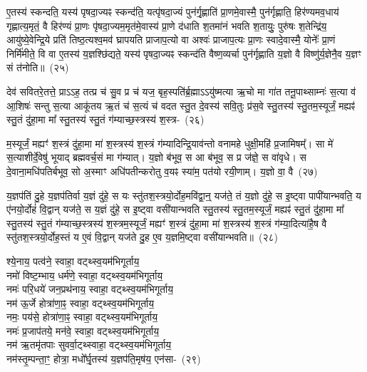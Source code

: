 ए॒तस्य॑ स्कन्दति॒ यस्य॑ पृषदा॒ज्यꣴ स्कन्द॑ति॒ यत्पृ॑षदा॒ज्यं पुन॑र्गृ॒ह्णाति॑ प्रा॒णमे॒वास्मै॒ पुन॑र्गृह्णाति॒ हिर॑ण्यमव॒धाय॑ गृह्णात्य॒मृतं॒ वै हिर॑ण्यं प्रा॒णः पृ॑षदा॒ज्यम॒मृत॑मे॒वास्य॑ प्रा॒णे द॑धाति श॒तमा॑नं भवति श॒तायुः॒ पुरु॑षः श॒तेन्द्रि॑य॒ आयु॑ष्ये॒वेन्द्रि॒ये प्रति॑ तिष्ठ॒त्यश्व॒मव॑ घ्रापयति प्राजाप॒त्यो वा अश्वः॑ प्राजाप॒त्यः प्रा॒णः स्वादे॒वास्मै॒ योनेः᳚ प्रा॒णं निर्मि॑मीते॒ वि वा ए॒तस्य॑ य॒ज्ञश्छि॑द्यते॒ यस्य॑ पृषदा॒ज्यꣴ स्कन्द॑ति वैष्ण॒व्यर्चा पुन॑र्गृह्णाति य॒ज्ञो वै विष्णु॑र्य॒ज्ञेनै॒व य॒ज्ञꣳ सं त॑नोति॥~(२५)\ip

{\anuvakamend[{ते॒ पृ॒ष॒दा॒ज्यं प्रा॒णो वै योनेः᳚ प्रा॒णं द्वाविꣳ॑शतिश्च}]}

देव॑ सवितरे॒तत्ते॒ प्रा\-ऽऽ\-ह॒ तत्प्र च॑ सु॒व प्र च॑ यज॒ बृह॒स्पति॑र्ब्र॒ह्मा\-ऽऽ\-यु॑ष्मत्या ऋ॒चो मा गा॑त तनू॒पाथ्साम्नः॑ स॒त्या व॑ आ॒शिषः॑ सन्तु स॒त्या आकू॑तय ऋ॒तं च॑ स॒त्यं च॑ वदत स्तु॒त दे॒वस्य॑ सवि॒तुः प्र॑स॒वे स्तु॒तस्य॑ स्तु॒तम॒स्यूर्जं॒ मह्यꣴ॑ स्तु॒तं दु॑हा॒मा मा᳚ स्तु॒तस्य॑ स्तु॒तं ग॑म्याच्छ॒स्त्रस्य॑ श॒स्त्र-~(२६)\ip

म॒स्यूर्जं॒ मह्यꣳ॑ श॒स्त्रं दु॑हा॒मा मा॑ श॒स्त्रस्य॑ श॒स्त्रं ग॑म्यादिन्द्रि॒याव॑न्तो वनामहे धुक्षी॒महि॑ प्र॒जामिषम्᳚। सा मे॑ स॒त्याशीर्दे॒वेषु॑ भूयाद् ब्रह्मवर्च॒सं मा ग॑म्यात्। य॒ज्ञो ब॑भूव॒ स आ ब॑भूव॒ स प्र ज॑ज्ञे॒ स वा॑वृधे। स दे॒वाना॒मधि॑\-पतिर्बभूव॒ सो अ॒स्माꣳ अधि॑पतीन्करोतु व॒यꣴ स्या॑म॒ पत॑यो रयी॒णाम्। य॒ज्ञो वा॒ वै~(२७)\ip

य॒ज्ञप॑तिं दु॒हे य॒ज्ञप॑तिर्वा य॒ज्ञं दु॑हे॒ स यः स्तु॑तश॒स्त्रयो॒र्दोह॒म\-वि॑द्वा॒न्॒ यज॑ते॒ तं य॒ज्ञो दु॑हे॒ स इ॒ष्ट्वा पापी॑यान्भवति॒ य ए॑नयो॒र्दोहं॑ वि॒द्वान् यज॑ते॒ स य॒ज्ञं दु॑हे॒ स इ॒ष्ट्वा वसी॑यान्भवति स्तु॒तस्य॑ स्तु॒तम॒स्यूर्जं॒ मह्यꣴ॑ स्तु॒तं दु॑हा॒मा मा᳚ स्तु॒तस्य॑ स्तु॒तं ग॑म्याच्छ॒स्त्रस्य॑ श॒स्त्रम॒स्यूर्जं॒ मह्यꣳ॑ श॒स्त्रं दु॑हा॒मा मा॑ श॒स्त्रस्य॑ श॒स्त्रं ग॑म्या॒दित्या॑है॒ष वै स्तु॑तश॒स्त्रयो॒र्दोह॒स्तं य ए॒वं वि॒द्वान् यज॑ते दु॒ह ए॒व य॒ज्ञमि॒ष्ट्वा वसी॑यान्भवति॥~(२८)\ip

{\anuvakamend[{श॒स्त्रं वै श॒स्त्रन्दु॑हा॒न्द्वाविꣳ॑शतिश्च}]}

श्ये॒नाय॒ पत्व॑ने॒ स्वाहा॒ वट्थ्स्व॒य\-म॑भि\-गूर्ताय॒\\
नमो॑ विष्ट॒म्भाय॒ धर्म॑णे॒ स्वाहा॒ वट्थ्स्व॒य\-म॑भि\-गूर्ताय॒\\
नमः॑ परि॒धये॑ जन॒प्रथ॑नाय॒ स्वाहा॒ वट्थ्स्व॒य\-म॑भि\-गूर्ताय॒\\
नम॑ ऊ॒र्जे होत्रा॑णा॒ꣴ॒ स्वाहा॒ वट्थ्स्व॒य\-म॑भि\-गूर्ताय॒\\
नमः॒ पय॑से॒ होत्रा॑णा॒ꣴ॒ स्वाहा॒ वट्थ्स्व॒य\-म॑भि\-गूर्ताय॒\\
नमः॑ प्र॒जा\-प॑तये॒ मन॑वे॒ स्वाहा॒ वट्थ्स्व॒य\-म॑भि\-गूर्ताय॒\\
नम॑ ऋ॒तमृ॑तपाः सुवर्वा॒ट्थ्\-स्वाहा॒ वट्थ्स्व॒य\-म॑भि\-गूर्ताय॒\\
नम॑स्तृ॒म्पन्ता॒ꣳ॒ होत्रा॒ मधो᳚र्घृ॒तस्य॑ य॒ज्ञप॑ति॒मृष॑य॒ एन॑सा-~(२९)\ip

